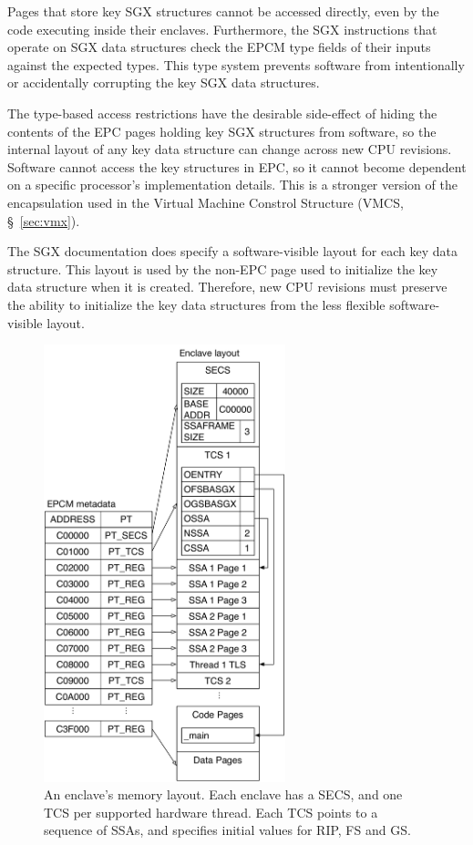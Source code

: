 
Pages that store key SGX structures cannot be accessed directly, even by the
code executing inside their enclaves. Furthermore, the SGX instructions that
operate on SGX data structures check the EPCM type fields of their inputs
against the expected types. This type system prevents software from
intentionally or accidentally corrupting the key SGX data structures.

The type-based access restrictions have the desirable side-effect of hiding the
contents of the EPC pages holding key SGX structures from software, so the
internal layout of any key data structure can change across new CPU revisions.
Software cannot access the key structures in EPC, so it cannot become dependent
on a specific processor's implementation details. This is a stronger version of
the encapsulation used in the Virtual Machine Constrol Structure
(VMCS, \S~\ref{sec:vmx}).

The SGX documentation does specify a software-visible layout for each key data
structure. This layout is used by the non-EPC page used to initialize the key
data structure when it is created. Therefore, new CPU revisions must preserve
the ability to initialize the key data structures from the less flexible
software-visible layout.

\begin{figure}[hbt!]
  \centering
  \includegraphics[width=70mm]{figures/enclave_layout.pdf}
  \caption{
    An enclave's memory layout. Each enclave has a SECS, and one TCS per
    supported hardware thread. Each TCS points to a sequence of SSAs, and
    specifies initial values for RIP, FS and GS.
  }
  \label{fig:enclave_layout}
\end{figure}

